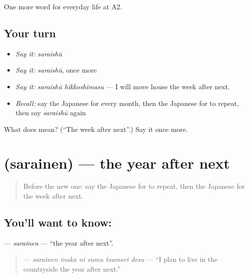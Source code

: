 \begin{grammarlens}[title={What you've built}]
One more word for everyday life at A2.
\end{grammarlens}

\subsection*{Your turn}
\begin{itemize}
\raggedright
  \item \emph{Say it:} \emph{saraishū}
  \item \emph{Say it:} \emph{saraishū}, once more
  \item \emph{Say it:} \emph{saraishū hikkoshimasu} — I will move house the week after next.
  \item \emph{Recall:} say the Japanese for every month, then the Japanese for to repeat, then say \emph{saraishū} again
\end{itemize}

\begin{tcolorbox}[breakable,colback=teal!4,colframe=teal!35!black,title={Before you move on}]
What does  mean? (\textquotedblleft{}The week after next\textquotedblright{}.) Say it once more.
\end{tcolorbox}
\section[\texorpdfstring{\ja{さらいねん} (sarainen)}{さらいねん (sarainen)}]{ (sarainen) — the year after next}

\label{lesson:JA-C170-sarainen}



\begin{quote}
Before the new one: say the Japanese for to repeat, then the Japanese for the week after next.
\end{quote}

\subsection*{You'll want to know: }
\textbf{} — \emph{sarainen} — \textquotedblleft{}the year after next\textquotedblright{}.

\begin{quote}
\textbf{   } — \emph{sarainen inaka ni sumu tsumori desu} — \textquotedblleft{}I plan to live in the countryside the year after next.\textquotedblright{}
\end{quote}

